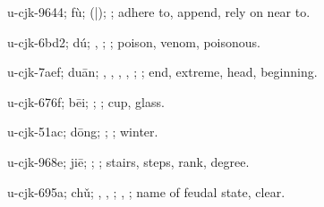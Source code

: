 \begin{multicols}{2}
{\cjkgGlue{}u-cjk-9644; fù; \cjkgGlue{}\cjkgGlue{}(\cjkgGlue{}|\cjkgGlue{}); \cjkgGlue{}; adhere to, append, rely on near to.

\cjkgGlue{}u-cjk-6bd2; dú; \cjkgGlue{}, \cjkgGlue{}; \cjkgGlue{}; poison, venom, poisonous.

\cjkgGlue{}u-cjk-7aef; duān; \cjkgGlue{}, \cjkgGlue{}, \cjkgGlue{}, \cjkgGlue{}, \cjkgGlue{}; \cjkgGlue{}; end, extreme, head, beginning.

\cjkgGlue{}u-cjk-676f; bēi; \cjkgGlue{}; \cjkgGlue{}; cup, glass.

\cjkgGlue{}u-cjk-51ac; dōng; \cjkgGlue{}; \cjkgGlue{}; winter.

\cjkgGlue{}u-cjk-968e; jiē; \cjkgGlue{}; \cjkgGlue{}; stairs, steps, rank, degree.

\cjkgGlue{}u-cjk-695a; chǔ; \cjkgGlue{}, \cjkgGlue{}, \cjkgGlue{}; \cjkgGlue{}, \cjkgGlue{}; name of feudal state, clear.

}
\end{multicols}
